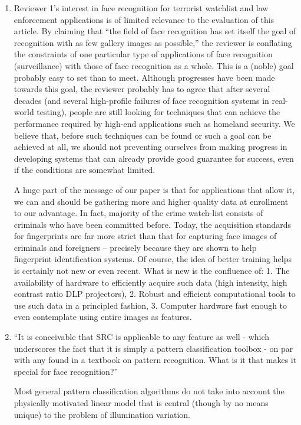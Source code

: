 \documentclass[11pt]{article}
\begin{document}
\begin{enumerate}
\item Reviewer 1's interest in face recognition for terrorist watchlist and law
enforcement applications is of limited relevance to the evaluation of this
article.  By claiming that ``the field of face recognition has set itself the
goal of recognition with as few gallery images as possible,'' the reviewer is
conflating the constraints of one particular type of applications of face
recognition (surveillance) with those of face recognition as a whole. This is a
(noble) goal probably easy to set than to meet. Although progresses have been
made towards this goal, the reviewer probably has to agree that after several
decades (and several high-profile failures of face recognition systems in
real-world testing), people are still looking for techniques that can achieve
the performance required by high-end applications such as homeland security. We
believe that, before such techniques can be found or such a goal can be
achieved at all, we should not preventing ourselves from making progress in
developing systems that can already provide good guarantee for success, even if
the conditions are somewhat limited. 

A huge part of the message of our paper is that for applications that allow it,
we can and should be gathering more and higher quality data at enrollment to
our advantage. In fact, majority of the crime watch-list consists of criminals
who have been committed before. Today, the acquisition standards for
fingerprints are far more strict than that for capturing face images of
criminals and foreigners -- precisely because they are shown to help
fingerprint identification systems. Of course, the idea of better training
helps is certainly not new or even recent.  What is new is the confluence of:
1. The availability of hardware to efficiently acquire such data (high
intensity, high contrast ratio DLP projectors), 2. Robust and efficient
computational tools to use such data in a principled fashion, 3. Computer
hardware fast enough to even contemplate using entire images as features.

\item ``It is conceivable that SRC is applicable to any feature as well - which
underscores the fact that it is simply a pattern classification toolbox - on
par with any found in a textbook on pattern recognition. What is it that makes
it special for face recognition?''

Most general pattern classification algorithms do not take into account the
physically motivated linear model that is central (though by no means unique)
to the problem of illumination variation.


\end{enumerate}
\end{document}
